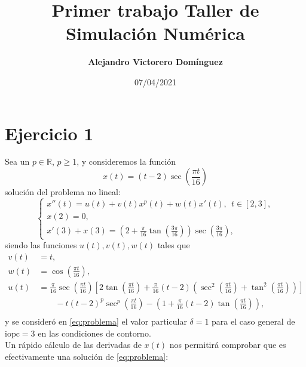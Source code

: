 \documentclass[11pt]{article}
\title{Primer trabajo Taller de Simulación Numérica}
\author{\textbf{Alejandro Victorero Domínguez}}
\date{07/04/2021}
\begin{document}
\maketitle

\section*{Ejercicio 1}

Sea un $p\in\mathbb{R}$, $p\geq 1$, y consideremos la función $$x(t)= (t-2)\sec \left(\frac{\pi t}{16}\right)$$ solución del problema no lineal:
\begin{equation} \label{eq:problema}
\begin{cases}
x''(t)=u(t)+v(t)x^p(t)+w(t)x'(t), ~~ t\in[2,3],\\
x(2)=0,\\
x'(3)+x(3)=\left( 2+\frac{\pi}{16}\tan\left(\frac{3\pi}{16}\right) \right)\sec\left(\frac{3\pi}{16}\right),
\end{cases}
\end{equation}
siendo las funciones $u(t),v(t), w(t)$ tales que
\begin{align*}
   v(t) &= t,\\
   w(t) &= \cos\left( \frac{\pi t}{16} \right),\\
   u(t) &= \frac{\pi}{16}\sec\left( \frac{\pi t}{16} \right)\left[ 2\tan\left( \frac{\pi t}{16} \right) + \frac{\pi}{16}(t-2)\left( \sec^2\left( \frac{\pi t}{16} \right) + \tan^2\left( \frac{\pi t}{16} \right) \right)\right]\\
   & \qquad -t(t-2)^p\sec^p\left( \frac{\pi t}{16} \right) - \left(1+\frac{\pi}{16}(t-2)\tan\left( \frac{\pi t }{16} \right)\right),\\
\end{align*}
y se consideró en \eqref{eq:problema} el valor particular $\delta=1$ para el caso general de $\text{iopc}=3$ en las condiciones de contorno.\\

Un rápido cálculo de las derivadas de $x(t)$ nos permitirá comprobar que es efectivamente una solución de \eqref{eq:problema}:
\end{document}

